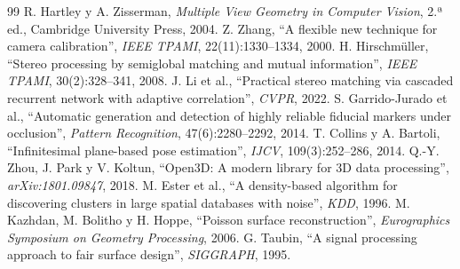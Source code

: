 \documentclass[10pt,a4paper,twocolumn]{article}
\begin{document}
\begin{thebibliography}{99}\footnotesize\setlength{\itemsep}{0pt}\setlength{\parsep}{0pt}
 R. Hartley y A. Zisserman, \emph{Multiple View Geometry in Computer Vision}, 2.ª ed., Cambridge University Press, 2004.
 Z. Zhang, ``A flexible new technique for camera calibration'', \emph{IEEE TPAMI}, 22(11):1330--1334, 2000.
 H. Hirschmüller, ``Stereo processing by semiglobal matching and mutual information'', \emph{IEEE TPAMI}, 30(2):328--341, 2008.
 J. Li et al., ``Practical stereo matching via cascaded recurrent network with adaptive correlation'', \emph{CVPR}, 2022.
 S. Garrido-Jurado et al., ``Automatic generation and detection of highly reliable fiducial markers under occlusion'', \emph{Pattern Recognition}, 47(6):2280--2292, 2014.
 T. Collins y A. Bartoli, ``Infinitesimal plane-based pose estimation'', \emph{IJCV}, 109(3):252--286, 2014.
 Q.-Y. Zhou, J. Park y V. Koltun, ``Open3D: A modern library for 3D data processing'', \emph{arXiv:1801.09847}, 2018.
 M. Ester et al., ``A density-based algorithm for discovering clusters in large spatial databases with noise'', \emph{KDD}, 1996.
 M. Kazhdan, M. Bolitho y H. Hoppe, ``Poisson surface reconstruction'', \emph{Eurographics Symposium on Geometry Processing}, 2006.
 G. Taubin, ``A signal processing approach to fair surface design'', \emph{SIGGRAPH}, 1995.
\end{thebibliography}
\end{document}
